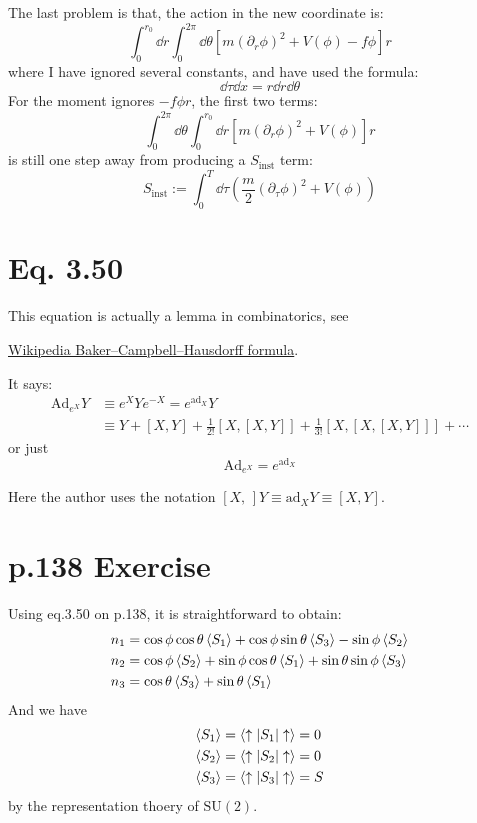 \documentclass{article}
\begin{document}
The last problem is that, the action in the new coordinate is:
\begin{equation}
    \int_0^{r_0}\dd{r} \int_0^{2\pi}\dd{\theta} \left[
        m(\partial_r\phi)^2+V(\phi)-f\phi\right] r
\end{equation}
where I have ignored several constants, and have used the formula:
\begin{equation}
    \dd{\tau}\dd{x} = r\dd{r}\dd{\theta}
\end{equation}
For the moment ignores $-f\phi r$, the first two terms:
\begin{equation}
    \int_0^{2\pi}\dd{\theta} \int_0^{r_0}\dd{r} \left[
        m(\partial_r\phi)^2 + V(\phi)
    \right] r
\end{equation}
is still one step away from producing a $S_{\text{inst}}$ term:
\begin{equation}
    S_{\text{inst}} := \int_0^T \dd{\tau} 
    \left(\frac{m}{2}(\partial_\tau\phi)^2 + V(\phi)\right)
\end{equation}
\section{Eq. 3.50}

This equation is actually a lemma in combinatorics, see

\href{https://en.wikipedia.org/wiki/Baker%E2%80%93Campbell%E2%80%93Hausdorff_formula#An_important_lemma}{Wikipedia
Baker–Campbell–Hausdorff formula}.

It says:
\begin{align}
    \mathrm{Ad}_{e^X}Y &\equiv e^X Y e^{-X} = e^{\mathrm{ad}_X}Y  \nonumber\\
    &\equiv Y + [X,Y] + \frac{1}{2!}[X,[X,Y]] + \frac{1}{3!}[X,[X,[X,Y]]] + \cdots
\end{align}
or just
\begin{equation}
    \mathrm{Ad}_{e^X} = e^{\mathrm{ad}_X}
\end{equation}

Here the author uses the notation $[X,\,] Y \equiv \mathrm{ad}_X Y \equiv
[X,Y]$.
\section{p.138 Exercise}
Using eq.3.50 on p.138, it is straightforward to obtain:
\begin{align*}
    n_1 &= \cos{\phi}\cos{\theta}\braket{S_1} +
    \cos{\phi}\sin{\theta}\braket{S_3} -\sin{\phi}\braket{S_2} \\
    n_2 &= \cos{\phi}\braket{S_2} + \sin{\phi}\cos{\theta}\braket{S_1} +
    \sin{\theta}\sin{\phi}\braket{S_3} \\
    n_3 &= \cos{\theta}\braket{S_3} + \sin{\theta}\braket{S_1}
\end{align*}
And we have
\begin{align*}
    \braket{S_1}&=\braket{\uparrow| S_1 |\uparrow} = 0 \\
    \braket{S_2}&=\braket{\uparrow| S_2 |\uparrow} = 0 \\
    \braket{S_3}&=\braket{\uparrow| S_3 |\uparrow} = S
\end{align*}
by the representation thoery of $\mathrm{SU}(2)$.
\end{document}
